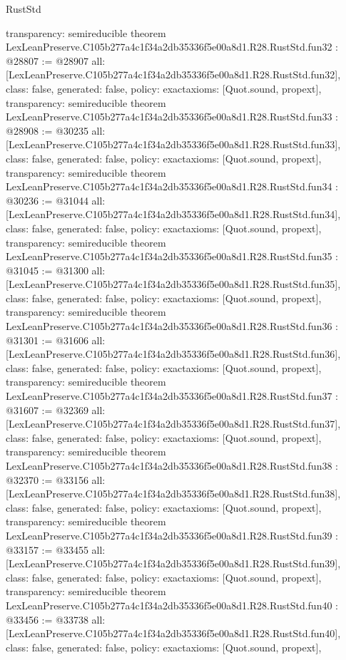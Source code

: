\begin{lexlean}{RustStd}
\begin{coremodule}
{  transparency: semireducible
}
theorem LexLeanPreserve.C105b277a4c1f34a2db35336f5e00a8d1.R28.RustStd.fun32 : @28807 := @28907 {
  all: [LexLeanPreserve.C105b277a4c1f34a2db35336f5e00a8d1.R28.RustStd.fun32],
  class: false,
  generated: false,
  policy: exact{axioms: [Quot.sound, propext]},
  transparency: semireducible
}
theorem LexLeanPreserve.C105b277a4c1f34a2db35336f5e00a8d1.R28.RustStd.fun33 : @28908 := @30235 {
  all: [LexLeanPreserve.C105b277a4c1f34a2db35336f5e00a8d1.R28.RustStd.fun33],
  class: false,
  generated: false,
  policy: exact{axioms: [Quot.sound, propext]},
  transparency: semireducible
}
theorem LexLeanPreserve.C105b277a4c1f34a2db35336f5e00a8d1.R28.RustStd.fun34 : @30236 := @31044 {
  all: [LexLeanPreserve.C105b277a4c1f34a2db35336f5e00a8d1.R28.RustStd.fun34],
  class: false,
  generated: false,
  policy: exact{axioms: [Quot.sound, propext]},
  transparency: semireducible
}
theorem LexLeanPreserve.C105b277a4c1f34a2db35336f5e00a8d1.R28.RustStd.fun35 : @31045 := @31300 {
  all: [LexLeanPreserve.C105b277a4c1f34a2db35336f5e00a8d1.R28.RustStd.fun35],
  class: false,
  generated: false,
  policy: exact{axioms: [Quot.sound, propext]},
  transparency: semireducible
}
theorem LexLeanPreserve.C105b277a4c1f34a2db35336f5e00a8d1.R28.RustStd.fun36 : @31301 := @31606 {
  all: [LexLeanPreserve.C105b277a4c1f34a2db35336f5e00a8d1.R28.RustStd.fun36],
  class: false,
  generated: false,
  policy: exact{axioms: [Quot.sound, propext]},
  transparency: semireducible
}
theorem LexLeanPreserve.C105b277a4c1f34a2db35336f5e00a8d1.R28.RustStd.fun37 : @31607 := @32369 {
  all: [LexLeanPreserve.C105b277a4c1f34a2db35336f5e00a8d1.R28.RustStd.fun37],
  class: false,
  generated: false,
  policy: exact{axioms: [Quot.sound, propext]},
  transparency: semireducible
}
theorem LexLeanPreserve.C105b277a4c1f34a2db35336f5e00a8d1.R28.RustStd.fun38 : @32370 := @33156 {
  all: [LexLeanPreserve.C105b277a4c1f34a2db35336f5e00a8d1.R28.RustStd.fun38],
  class: false,
  generated: false,
  policy: exact{axioms: [Quot.sound, propext]},
  transparency: semireducible
}
theorem LexLeanPreserve.C105b277a4c1f34a2db35336f5e00a8d1.R28.RustStd.fun39 : @33157 := @33455 {
  all: [LexLeanPreserve.C105b277a4c1f34a2db35336f5e00a8d1.R28.RustStd.fun39],
  class: false,
  generated: false,
  policy: exact{axioms: [Quot.sound, propext]},
  transparency: semireducible
}
theorem LexLeanPreserve.C105b277a4c1f34a2db35336f5e00a8d1.R28.RustStd.fun40 : @33456 := @33738 {
  all: [LexLeanPreserve.C105b277a4c1f34a2db35336f5e00a8d1.R28.RustStd.fun40],
  class: false,
  generated: false,
  policy: exact{axioms: [Quot.sound, propext]},
}
\end{coremodule}
\end{lexlean}
